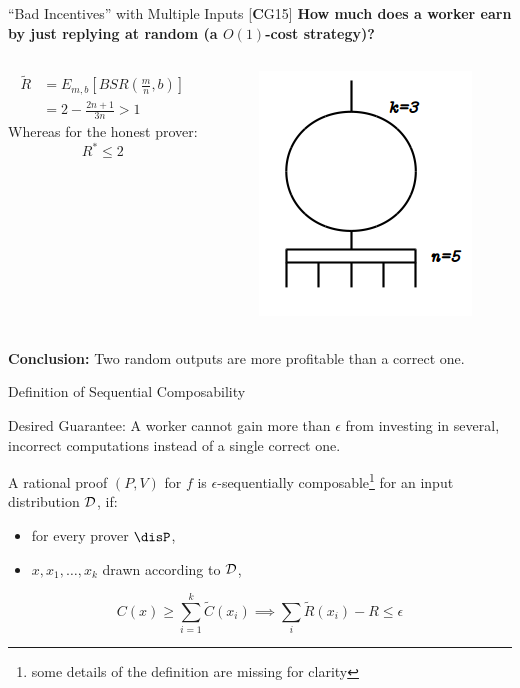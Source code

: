 \begin{frame}{``Bad Incentives'' with Multiple Inputs [\textbf{C}G15]}
	\large{\textbf{How much does a worker earn by just replying at random (a $O(1)$-cost strategy)?}}
	\pause
	\begin{columns}
		\begin{align*}
		\tilde{R} &=E_{m,b}[BSR(\frac{m}{n}, b)] \\
		&=2-\frac{2n+1}{3n} > 1
		\end{align*}
		\pause
		Whereas for the honest prover:
		\[
		R^* \leq 2
		\]
		\onslide<1->
		\begin{figure}
			\includegraphics[scale=0.7]{pics/threshold-circ.png}
			
		\end{figure}
	\end{columns}
	\pause

	\noindent
\textbf{Conclusion:} Two random outputs are more profitable than a correct one.
\end{frame}


\begin{frame}{Definition of Sequential Composability}
		
		\begin{block}{Desired Guarantee:}
		A worker cannot gain more than $\epsilon$ from investing in several, incorrect computations instead of a single correct one.
		\end{block}
		
		\bigskip
		\pause
		
		\begin{framed}
		A rational proof $(P,V)$ for $f$ 
		is $\epsilon$-{\sf sequentially composable}\footnote<2->{some details of the definition are missing for clarity} for an input distribution $\cal D$, if:
		\begin{itemize}
			\item  for every prover $\disP$, 
			\item	$x,x_1,\ldots,x_k$ drawn according to ${\cal D}$,
		\end{itemize}
		 $$C(x) \geq \sum_{i=1}^k 
		\tilde{C}(x_i)\implies \sum_{i}\tilde{R}(x_i) - R \leq \epsilon$$
		\end{framed}
		
\end{frame}

